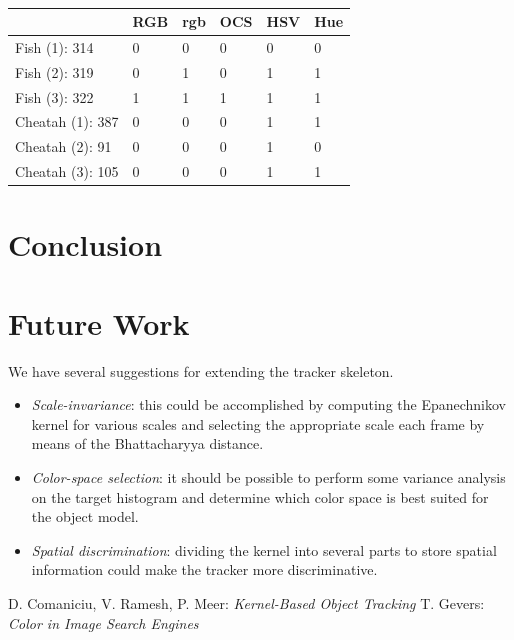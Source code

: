 \documentclass[a4paper,11pt]{article}
\begin{document}
		\begin{table}[H]
			\centering
			\begin{tabular}{ | l | l | l | l | l | l |}
			\hline
			                   & RGB & rgb & OCS & HSV & Hue \\
			\hline
			Fish    (1): 314   & 0   & 0   & 0   & 0   & 0 \\
			Fish    (2): 319   & 0   & 1   & 0   & 1   & 1 \\
			Fish    (3): 322   & 1   & 1   & 1   & 1   & 1 \\
			Cheatah (1): 387   & 0   & 0   & 0   & 1   & 1 \\
			Cheatah (2):  91   & 0   & 0   & 0   & 1   & 0 \\
			Cheatah (3): 105   & 0   & 0   & 0   & 1   & 1 \\
			\hline
			\end{tabular}
			\caption{}
		\end{table}
		\noindent


	\section{Conclusion}

	\section{Future Work}
		We have several suggestions for extending the tracker skeleton.

		\begin{itemize}
		\item{
			\emph{Scale-invariance}: this could be accomplished by computing the
			Epanechnikov kernel for various scales and selecting the appropriate
			scale each frame by means of the Bhattacharyya distance.
		}
		\item{
			\emph{Color-space selection}: it should be possible to perform some
			variance analysis on the target histogram and determine which color
			space is best suited for the object model.
		}
		\item{
			\emph{Spatial discrimination}: dividing the kernel into several parts
			to store spatial information could make the tracker more discriminative.
		}
		\end{itemize}

	\begin{thebibliography}{2}
			D. Comaniciu, V. Ramesh, P. Meer: \textit{Kernel-Based Object Tracking}
			T. Gevers: \textit{Color in Image Search Engines}
	\end{thebibliography}
\end{document}
